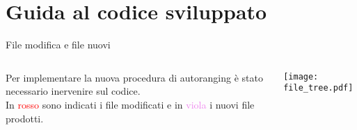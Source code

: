 \section{Guida al codice sviluppato}
\begin{frame}{File modifica e file nuovi}
  \begin{columns}
    \begin{column}{0.7\textwidth}
      Per implementare la \alert{nuova} procedura di autoranging
      è stato necessario inervenire sul codice.\\
      In \textcolor{red}{rosso} sono indicati i file modificati e in
      \textcolor{violet}{viola} i nuovi file prodotti.
    \end{column}
    \begin{column}{0.3\textwidth}
      \centering
      \texttt{[image: file\_tree.pdf]}
    \end{column}
  \end{columns}

\end{frame}
